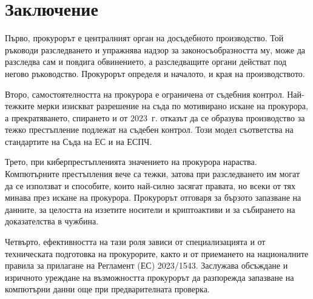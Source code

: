 \section{Заключение}
\label{sec:zaklyuchenie}

Първо, прокурорът е централният орган на досъдебното производство. Той ръководи
разследването и упражнява надзор за законосъобразността му, може да разследва сам и
повдига обвинението, а разследващите органи действат под негово ръководство. Прокурорът
определя и началото, и края на производството.

Второ, самостоятелността на прокурора е ограничена от съдебния контрол. Най-тежките
мерки изискват разрешение на съда по мотивирано искане на прокурора, а прекратяването,
спирането и от 2023~г. отказът да се образува производство за тежко престъпление подлежат
на съдебен контрол. Този модел съответства на стандартите на Съда на ЕС и на ЕСПЧ.

Трето, при киберпрестъпленията значението на прокурора нараства. Компютърните
престъпления вече са тежки, затова при разследването им могат да се използват и
способите, които най-силно засягат правата, но всеки от тях минава през искане на
прокурора. Прокурорът отговаря за бързото запазване на данните, за целостта на иззетите
носители и криптоактиви и за събирането на доказателства в чужбина.

Четвърто, ефективността на тази роля зависи от специализацията и от техническата
подготовка на прокурорите, както и от приемането на националните правила за
прилагане на Регламент (ЕС) 2023/1543. Заслужава обсъждане и изричното уреждане на възможността
прокурорът да разпорежда запазване на компютърни данни още при предварителната проверка.
